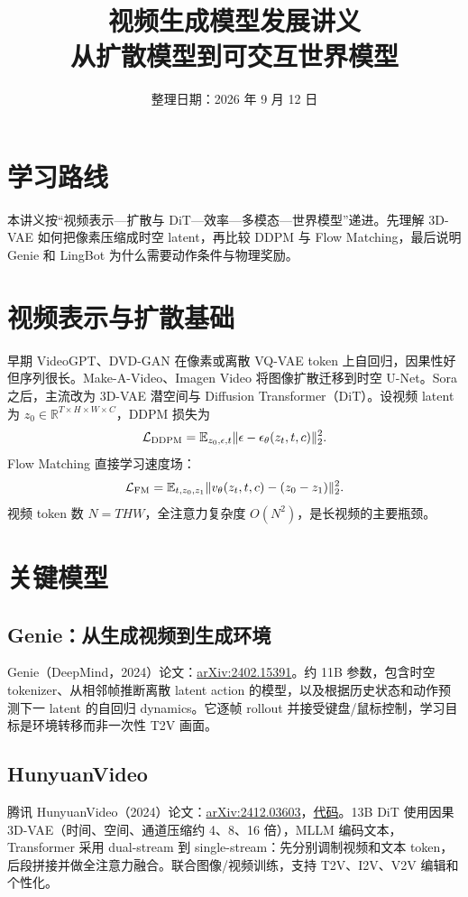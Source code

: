 \documentclass[UTF8,a4paper,12pt]{ctexart}
\title{视频生成模型发展讲义\\从扩散模型到可交互世界模型}
\author{整理日期：2026 年 9 月 12 日}
\date{}
\begin{document}
\maketitle
\tableofcontents
\section{学习路线}
本讲义按“视频表示—扩散与 DiT—效率—多模态—世界模型”递进。先理解 3D-VAE 如何把像素压缩成时空 latent，再比较 DDPM 与 Flow Matching，最后说明 Genie 和 LingBot 为什么需要动作条件与物理奖励。

\section{视频表示与扩散基础}
早期 VideoGPT、DVD-GAN 在像素或离散 VQ-VAE token 上自回归，因果性好但序列很长。Make-A-Video、Imagen Video 将图像扩散迁移到时空 U-Net。Sora 之后，主流改为 3D-VAE 潜空间与 Diffusion Transformer（DiT）。设视频 latent 为 $z_0\in\mathbb R^{T\times H\times W\times C}$，DDPM 损失为
\[
\mathcal L_{\rm DDPM}=\mathbb E_{z_0,\epsilon,t}\|\epsilon-\epsilon_\theta(z_t,t,c)\|_2^2.
\]
Flow Matching 直接学习速度场：
\[
\mathcal L_{\rm FM}=\mathbb E_{t,z_0,z_1}\|v_\theta(z_t,t,c)-(z_0-z_1)\|_2^2.
\]
视频 token 数 $N=T H W$，全注意力复杂度 $O(N^2)$，是长视频的主要瓶颈。

\section{关键模型}
\subsection{Genie：从生成视频到生成环境}
Genie（DeepMind，2024）论文：\href{https://arxiv.org/abs/2402.15391}{arXiv:2402.15391}。约 11B 参数，包含时空 tokenizer、从相邻帧推断离散 latent action 的模型，以及根据历史状态和动作预测下一 latent 的自回归 dynamics。它逐帧 rollout 并接受键盘/鼠标控制，学习目标是环境转移而非一次性 T2V 画面。

\subsection{HunyuanVideo}
腾讯 HunyuanVideo（2024）论文：\href{https://arxiv.org/abs/2412.03603}{arXiv:2412.03603}，\href{https://github.com/Tencent-Hunyuan/HunyuanVideo}{代码}。13B DiT 使用因果 3D-VAE（时间、空间、通道压缩约 4、8、16 倍），MLLM 编码文本，Transformer 采用 dual-stream 到 single-stream：先分别调制视频和文本 token，后段拼接并做全注意力融合。联合图像/视频训练，支持 T2V、I2V、V2V 编辑和个性化。
\end{document}
